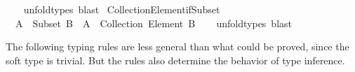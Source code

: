 \begin{isabellebody}
%
\isadelimproof
\ \ %
\endisadelimproof
%
\isatagproof
{}\isamarkupfalse%
\ unfold{\isacharunderscore}{\kern0pt}types\ blast%
\endisatagproof
{\isafoldproof}%
%
\isadelimproof
\isanewline
%
\endisadelimproof
\isanewline
{}\isamarkupfalse%
\ Collection{\isacharunderscore}{\kern0pt}Element{\isacharunderscore}{\kern0pt}if{\isacharunderscore}{\kern0pt}Subset{\isacharcolon}{\kern0pt}\isanewline
\ \ {\isachardoublequoteopen}A\ {\isacharcolon}{\kern0pt}\ Subset\ B\ {\isasymLongrightarrow}\ A\ {\isacharcolon}{\kern0pt}\ Collection\ {\isacharparenleft}{\kern0pt}Element\ B{\isacharparenright}{\kern0pt}{\isachardoublequoteclose}\isanewline
%
\isadelimproof
\ \ %
\endisadelimproof
%
\isatagproof
{}\isamarkupfalse%
\ unfold{\isacharunderscore}{\kern0pt}types\ blast%
\endisatagproof
{\isafoldproof}%
%
\isadelimproof
%
\endisadelimproof
%
\isadelimdocument
%
\endisadelimdocument
%
\isatagdocument
%
\isamarkuptrue%
%
\endisatagdocument
{\isafolddocument}%
%
\isadelimdocument
%
\endisadelimdocument
%
\begin{isamarkuptext}%
The following typing rules are less general than what could be proved, since the
 soft type is trivial. But the rules also determine the behavior of
type inference.


\end{isamarkuptext}
\end{isabellebody}
